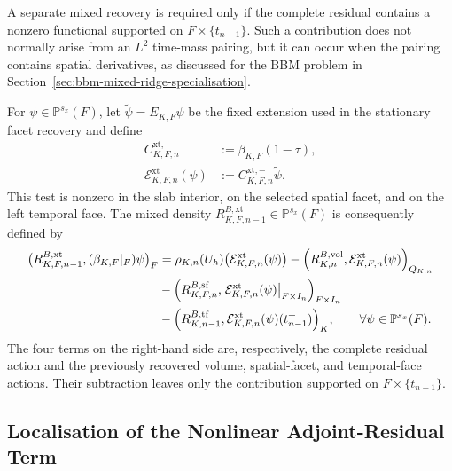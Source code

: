 \begin{remark}
\label{rem:mixed-space-time-ridge}

A separate mixed recovery is required only if the complete residual contains a nonzero functional supported on \(F\times\{t_{n-1}\}\). Such a contribution does not normally arise from an \(L^2\) time-mass pairing, but it can occur when the pairing contains spatial derivatives, as discussed for the BBM problem in Section~\ref{sec:bbm-mixed-ridge-specialisation}.

For \(\psi\in\mathbb P^{s_x}(F)\), let \(\widetilde\psi=E_{K,F}\psi\) be the fixed extension used in the stationary facet recovery and define
\begin{equation}
  \begin{aligned}
  C_{K,F,n}^{\mathrm{xt},-}
  &:=
  \beta_{K,F}(1-\tau),
  \\
  \mathcal{E}_{K,F,n}^{\mathrm{xt}}(\psi)
  &:=
  C_{K,F,n}^{\mathrm{xt},-}\widetilde\psi.
  \end{aligned}
  \label{eq:mixed-ridge-test}
\end{equation}
This test is nonzero in the slab interior, on the selected spatial facet, and on the left temporal face. The mixed density \(R_{K,F,n-1}^{B,\mathrm{xt}}\in\mathbb P^{s_x}(F)\) is consequently defined by
\begin{align}
  \bigl(
    R_{K,F,n-1}^{B,\mathrm{xt}},
    (\beta_{K,F}|_F)\psi
  \bigr)_F &=
  \rho_{K,n}(U_h)
  \bigl(\mathcal{E}_{K,F,n}^{\mathrm{xt}}(\psi)\bigr)
  -
  \Bigl(
    R_{K,n}^{B,\mathrm{vol}},
    \mathcal{E}_{K,F,n}^{\mathrm{xt}}(\psi)
  \Bigr)_{Q_{K,n}}
  \notag\\
  &-
  \Bigl(
    R_{K,F,n}^{B,\mathrm{sf}},
    \left.\mathcal{E}_{K,F,n}^{\mathrm{xt}}(\psi)\right|_{F\times I_n}
  \Bigr)_{F\times I_n}
  \notag\\
  &-
  \Bigl(
    R_{K,n-1}^{B,\mathrm{tf}},
    \mathcal{E}_{K,F,n}^{\mathrm{xt}}(\psi)(t_{n-1}^{+})
  \Bigr)_K,
  \qquad
  \forall\psi\in\mathbb P^{s_x}(F).
  \label{eq:mixed-ridge-recovery}
\end{align}
The four terms on the right-hand side are, respectively, the complete residual action and the previously recovered volume, spatial-facet, and temporal-face actions. Their subtraction leaves only the contribution supported on \(F\times\{t_{n-1}\}\).
\end{remark}


\subsection{Localisation of the Nonlinear Adjoint-Residual Term}
\label{sec:nonlinear-adjoint-residual-localisation}

